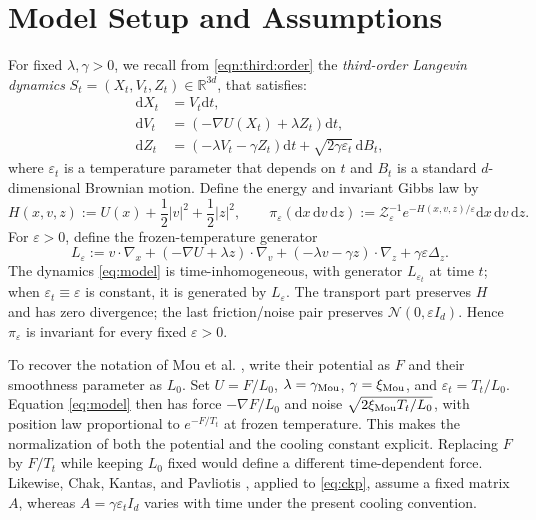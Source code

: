 \documentclass[11pt]{article}
\theoremstyle{definition}
\newcommand{\R}{\mathbb R}
\newcommand{\dd}{\mathrm d}
\newcommand{\Id}{I}
\newcommand{\eps}{\varepsilon}
\begin{document}
\section{Model Setup and Assumptions}\label{sec:model}

For fixed $\lambda,\gamma>0$, we recall from \eqref{eqn:third:order} the \textit{third-order Langevin dynamics} 
$S_t=(X_t,V_t,Z_t)\in\R^{3d}$, that satisfies:
\begin{equation}\label{eq:model}
\begin{aligned}
 \dd X_t&=V_t\dd t,\\
 \dd V_t&=(-\nabla U(X_t)+\lambda Z_t)\dd t,\\
 \dd Z_t&=(-\lambda V_t-\gamma Z_t)\dd t
                 +\sqrt{2\gamma\eps_t}\,\dd B_t,
\end{aligned}
\end{equation}
where $\varepsilon_{t}$ is a temperature parameter
that depends on $t$ and $B_{t}$ is a standard $d$-dimensional Brownian motion.
Define the energy and invariant Gibbs law by
\begin{equation}\label{eq:gibbs}
 H(x,v,z):=U(x)+\frac12|v|^2+\frac12|z|^2,
 \qquad \pi_\eps(\dd x\,\dd v\,\dd z)
   :=\mathcal Z_\eps^{-1}e^{-H(x,v,z)/\eps}\dd x\,\dd v\,\dd z.
\end{equation}
For $\eps>0$, define the frozen-temperature generator
\begin{equation}\label{eq:generator}
 L_\eps:=v\cdot\nabla_x+(-\nabla U+\lambda z)\cdot\nabla_v
       +(-\lambda v-\gamma z)\cdot\nabla_z+\gamma\eps\Delta_z.
\end{equation}
The dynamics \eqref{eq:model} is time-inhomogeneous, with generator
$L_{\eps_t}$ at time $t$; when $\eps_t\equiv\eps$ is constant, it is generated by $L_\eps$.
The transport part preserves $H$ and has zero divergence; the last friction/noise
pair preserves $\mathcal N(0,\eps\Id_d)$. Hence $\pi_\eps$ is invariant for every
fixed $\eps>0$.

To recover the notation of Mou et al. \cite{MouEtAl2021}, write their potential as $F$ and their
smoothness parameter as $L_0$. Set $U=F/L_0$, $\lambda=\gamma_{\rm Mou}$,
$\gamma=\xi_{\rm Mou}$, and $\eps_t=T_t/L_0$. Equation \eqref{eq:model} then has
force $-\nabla F/L_0$ and noise $\sqrt{2\xi_{\rm Mou}T_t/L_0}$, with position
law proportional to $e^{-F/T_t}$ at frozen temperature. This makes the
normalization of both the potential and the cooling constant explicit.
Replacing $F$ by $F/T_t$ while keeping $L_0$ fixed would define a different
time-dependent force.
Likewise, Chak, Kantas, and Pavliotis
\cite[Theorem~2.7]{ChakKantasPavliotis2023}, applied to \eqref{eq:ckp}, assume a fixed
matrix $A$, whereas $A=\gamma\eps_t\Id_d$ varies with time under the present
cooling convention.
\end{document}
